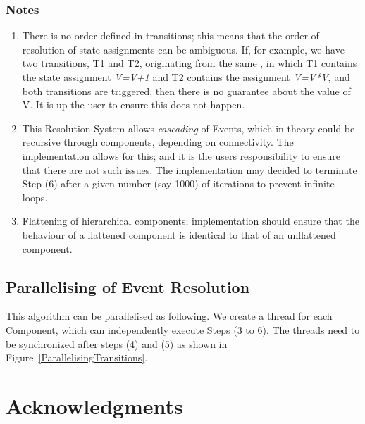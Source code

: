 \documentclass[draftspec]{ninemlspec}
\newcommand{\Regime}{\defRef{\textbf{\class{Regime}}\xspace}{sec:Regime}}
\begin{document}
\subsubsection{Notes}

\begin{enumerate}
\item  There is no order defined in transitions; this means
that the order of resolution of state assignments can be ambiguous. If, for
example, we have two transitions, T1 and T2, originating from the same \Regime,
in which T1 contains the state assignment \textsl{V=V+1} and T2 contains the
assignment \textsl{V=V*V}, and both transitions are triggered, then there is no
guarantee about the value of V. It is up the user to ensure this does not
happen.

\item This Resolution System allows \emph{cascading} of Events, which in theory
could be recursive through components, depending on connectivity. The
implementation allows for this; and it is the users responsibility to ensure
that there are not such issues. The implementation may decided to terminate
Step (6) after a given number (say 1000) of iterations to prevent infinite
loops.

\item Flattening of hierarchical components; implementation should ensure that
the behaviour of a flattened component is identical to that of an unflattened
component.
\end{enumerate}

\subsection{Parallelising of Event Resolution}

This algorithm can be parallelised as following. We create a thread for each
Component, which can independently execute Steps (3 to 6). The threads need
to be synchronized after steps (4) and (5) as shown in
Figure~\ref{ParallelisingTransitions}.


\section{Acknowledgments}



\clearpage




\end{document}

